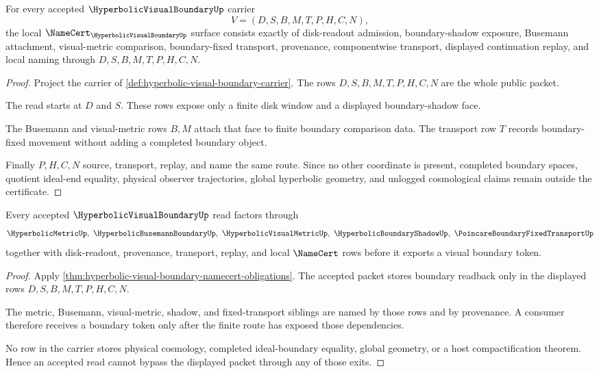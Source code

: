 \begin{theorem}
\label{thm:hyperbolic-visual-boundary-namecert-obligations}
For every accepted $\HyperbolicVisualBoundaryUp$ carrier
$$
V=(D,S,B,M,T,P,H,C,N),
$$
the local $\NameCert_{\HyperbolicVisualBoundaryUp}$ surface consists exactly of disk-readout admission, boundary-shadow exposure, Busemann attachment, visual-metric comparison, boundary-fixed transport, provenance, componentwise transport, displayed continuation replay, and local naming through $D,S,B,M,T,P,H,C,N$.
\end{theorem}
\begin{proof}
Project the carrier of \autoref{def:hyperbolic-visual-boundary-carrier}. The rows $D,S,B,M,T,P,H,C,N$ are the whole public packet.

The read starts at $D$ and $S$. These rows expose only a finite disk window and a displayed boundary-shadow face.

The Busemann and visual-metric rows $B,M$ attach that face to finite boundary comparison data. The transport row $T$ records boundary-fixed movement without adding a completed boundary object.

Finally $P,H,C,N$ source, transport, replay, and name the same route. Since no other coordinate is present, completed boundary spaces, quotient ideal-end equality, physical observer trajectories, global hyperbolic geometry, and unlogged cosmological claims remain outside the certificate.
\end{proof}

\begin{theorem}
\label{thm:hyperbolic-visual-boundary-readback-nonescape}
Every accepted $\HyperbolicVisualBoundaryUp$ read factors through
$$
\HyperbolicMetricUp,\ \HyperbolicBusemannBoundaryUp,\ \HyperbolicVisualMetricUp,\ \HyperbolicBoundaryShadowUp,\ \PoincareBoundaryFixedTransportUp
$$
together with disk-readout, provenance, transport, replay, and local $\NameCert$ rows before it exports a visual boundary token.
\end{theorem}
\begin{proof}
Apply \autoref{thm:hyperbolic-visual-boundary-namecert-obligations}. The accepted packet stores boundary readback only in the displayed rows $D,S,B,M,T,P,H,C,N$.

The metric, Busemann, visual-metric, shadow, and fixed-transport siblings are named by those rows and by provenance. A consumer therefore receives a boundary token only after the finite route has exposed those dependencies.

No row in the carrier stores physical cosmology, completed ideal-boundary equality, global geometry, or a host compactification theorem. Hence an accepted read cannot bypass the displayed packet through any of those exits.
\end{proof}

